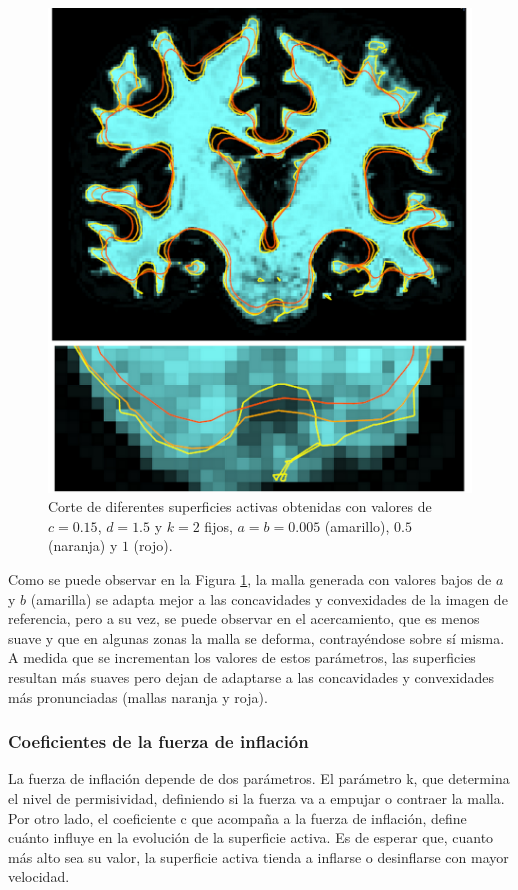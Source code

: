\begin{figure}[H]
	\centering
	\includegraphics[scale=0.05]{images/sensibilidad4.jpg}
	\caption{Corte de diferentes superficies activas obtenidas con valores de $c=0.15$, $d=1.5$ y $k=2$ fijos, $a = b = 0.005$ (amarillo), $0.5$ (naranja) y $1$ (rojo). }
	\label{fig:sensibilidad4}
\end{figure}

Como se puede observar en la Figura \ref{fig:sensibilidad4}, la malla generada con valores bajos de $a$ y $b$ (amarilla) se adapta mejor a las concavidades y convexidades de la imagen de referencia, pero a su vez, se puede observar en el acercamiento, que es menos suave y que en algunas zonas la malla se deforma, contrayéndose sobre sí misma. A medida que se incrementan los valores de estos parámetros, las superficies resultan más suaves pero dejan de adaptarse a las concavidades y convexidades más pronunciadas (mallas naranja y roja). 

\subsubsection{Coeficientes de la fuerza de inflación}
La fuerza de inflación depende de dos parámetros. El parámetro k, que determina el nivel de permisividad, definiendo si la fuerza va a empujar o contraer la malla. Por otro lado,  el coeficiente c que acompaña a la fuerza de inflación, define  cuánto influye en la evolución de la superficie activa. Es de esperar que, cuanto más alto sea su valor, la superficie activa tienda a inflarse o desinflarse con mayor velocidad.

